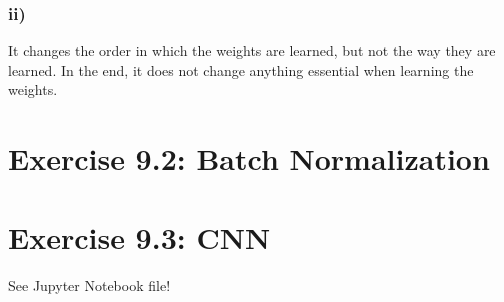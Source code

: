 \documentclass[a4paper]{article}
\begin{document}
        \subsubsection*{ii)}
            It changes the order in which the weights are learned, but not the way they are learned.
            In the end, it does not change anything essential when learning the weights.



\section*{Exercise 9.2: Batch Normalization}
    


\section*{Exercise 9.3: CNN}
    See Jupyter Notebook file!
\end{document}
